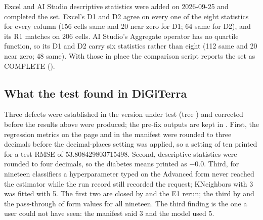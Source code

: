 Excel and AI Studio descriptive statistics were added on 2026-09-25 and completed the set. Excel's D1 and D2 agree on every one of the eight statistics for every column (156 cells same and 20 near zero for D1; 64 same for D2), and its R1 matches on 206 cells. AI Studio's Aggregate operator has no quartile function, so its D1 and D2 carry six statistics rather than eight (112 same and 20 near zero; 48 same). With those in place the comparison script reports the set as COMPLETE ().

\subsection{What the test found in DiGiTerra}

Three defects were established in the version under test (tree ) and corrected before the results above were produced; the pre-fix outputs are kept in . First, the regression metrics on the page and in the manifest were rounded to three decimals before the decimal-places setting was applied, so a setting of ten printed  for a test RMSE of 53.808429803715498. Second, descriptive statistics were rounded to four decimals, so the diabetes means printed as $-0.0$. Third, for nineteen classifiers a hyperparameter typed on the Advanced form never reached the estimator while the run record still recorded the request; KNeighbors with  3 was fitted with 5. The first two are closed by  and the E1 rerun; the third by  and the pass-through of form values for all nineteen. The third finding is the one a user could not have seen: the manifest said 3 and the model used 5.
